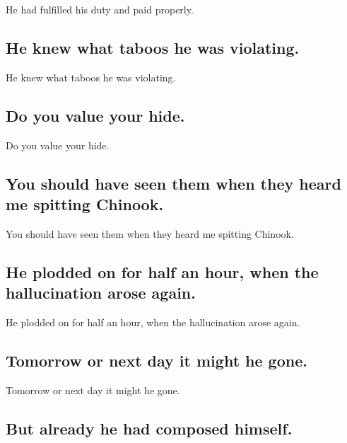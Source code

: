 \documentclass[]{article}
\begin{document}
He had fulfilled his duty and paid properly.

\hypertarget{he-knew-what-taboos-he-was-violating.}{%
\subsection{He knew what taboos he was
violating.}\label{he-knew-what-taboos-he-was-violating.}}

He knew what taboos he was violating.

\hypertarget{do-you-value-your-hide.}{%
\subsection{Do you value your hide.}\label{do-you-value-your-hide.}}

Do you value your hide.

\hypertarget{you-should-have-seen-them-when-they-heard-me-spitting-chinook.}{%
\subsection{You should have seen them when they heard me spitting
Chinook.}\label{you-should-have-seen-them-when-they-heard-me-spitting-chinook.}}

You should have seen them when they heard me spitting Chinook.

\hypertarget{he-plodded-on-for-half-an-hour-when-the-hallucination-arose-again.}{%
\subsection{He plodded on for half an hour, when the hallucination arose
again.}\label{he-plodded-on-for-half-an-hour-when-the-hallucination-arose-again.}}

He plodded on for half an hour, when the hallucination arose again.

\hypertarget{tomorrow-or-next-day-it-might-he-gone.}{%
\subsection{Tomorrow or next day it might he
gone.}\label{tomorrow-or-next-day-it-might-he-gone.}}

Tomorrow or next day it might he gone.

\hypertarget{but-already-he-had-composed-himself.}{%
\subsection{But already he had composed
himself.}\label{but-already-he-had-composed-himself.}}
\end{document}

